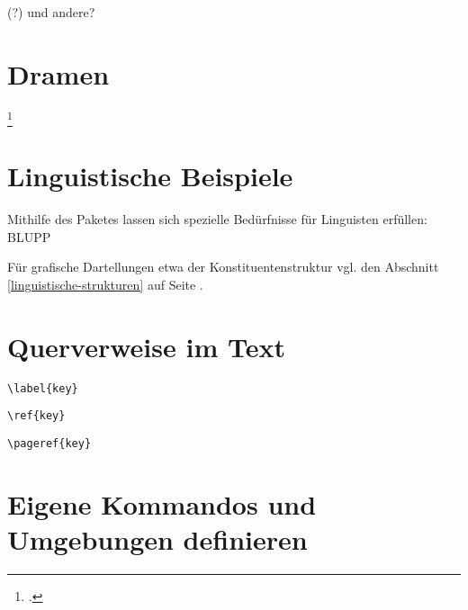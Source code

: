  (?) und andere?

\section{Dramen}
\footcite[xxx]{lesetypografie}


\section{Linguistische Beispiele}
\label{linguistische-beispiele}

Mithilfe des Paketes  lassen sich spezielle Bedürfnisse für Linguisten erfüllen: BLUPP

Für grafische Dartellungen etwa der Konstituentenstruktur vgl. den Abschnitt 
\ref{linguistische-strukturen} auf Seite \pageref{linguistische-strukturen}.

\section{Querverweise im Text}


\lstinline/\label{key}/

\lstinline/\ref{key}/

\lstinline/\pageref{key}/


\section{Eigene Kommandos und Umgebungen definieren}
\label{makros}


